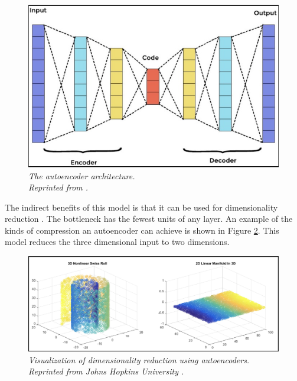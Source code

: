 \begin{figure}[H]
  \centering
  \caption[The autoencoder architecture.]{\emph{The autoencoder architecture. \\
      Reprinted from \citeauthor{pedamkar_2019} \citeyear{pedamkar_2019}.}}\label{fig:ae_architecture}
  \includegraphics[scale = 0.5]{figures/ae_architecture.jpg}
\end{figure}


The indirect benefits of this model is that it can be used for dimensionality reduction \cite{rajan_2021}. The bottleneck has the fewest units of any layer. An example of the kinds of compression an autoencoder can achieve is shown in Figure \ref{fig:ae_f_reduction}. This model reduces the three dimensional input to two dimensions.


\begin{figure}[H]
  \centering
  \caption[Visualization of dimensionality reduction using autoencoders.]{\emph{Visualization of dimensionality reduction using autoencoders. \\
      Reprinted from Johns Hopkins University \citeyear{johns_hopkins_university_2015}.}}\label{fig:ae_f_reduction}
  \includegraphics[scale = 0.2]{figures/ae_f_reduction.jpg}
\end{figure}


